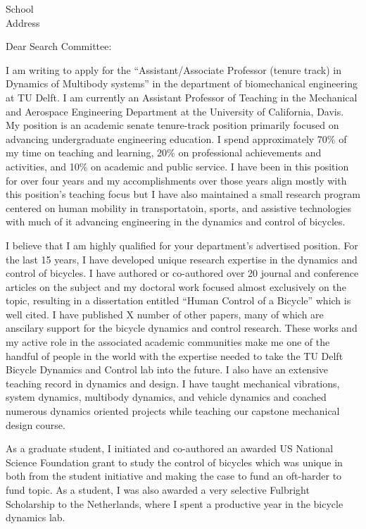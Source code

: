 \documentclass{letter}
\date{}
\begin{document}
\begin{letter}{
  School \\
  Address
}

\opening{Dear Search Committee:}

I am writing to apply for the ``Assistant/Associate Professor (tenure track) in
Dynamics of Multibody systems'' in the department of biomechanical engineering
at TU Delft. I am currently an Assistant Professor of Teaching in the
Mechanical and Aerospace Engineering Department at the University of
California, Davis. My position is an academic senate tenure-track position
primarily focused on advancing undergraduate engineering education. I spend
approximately 70\% of my time on teaching and learning, 20\% on professional
achievements and activities, and 10\% on academic and public service. I have
been in this position for over four years and my accomplishments over those
years align mostly with this position's teaching focus but I have also
maintained a small research program centered on human mobility in
transportatoin, sports, and assistive technologies with much of it advancing
engineering in the dynamics and control of bicycles.

I believe that I am highly qualified for your department's advertised position.
For the last 15 years, I have developed unique research expertise in the
dynamics and control of bicycles. I have authored or co-authored over 20
journal and conference articles on the subject and my doctoral work focused
almost exclusively on the topic, resulting in a dissertation entitled ``Human
Control of a Bicycle'' which is well cited. I have published X number of other
papers, many of which are anscilary support for the bicycle dynamics and
control research. These works and my active role in the associated academic
communities make me one of the handful of people in the world with the
expertise needed to take the TU Delft Bicycle Dynamics and Control lab into the
future. I also have an extensive teaching record in dynamics and design. I have
taught mechanical vibrations, system dynamics, multibody dynamics, and vehicle
dynamics and coached numerous dynamics oriented projects while teaching our
capstone mechanical design course.

As a graduate student, I initiated and co-authored an awarded US National
Science Foundation grant to study the control of bicycles which was unique in
both from the student initiative and making the case to fund an oft-harder to
fund topic. As a student, I was also awarded a very selective Fulbright
Scholarship to the Netherlands, where I spent a productive year in the bicycle
dynamics lab.


\end{letter}
\end{document}
